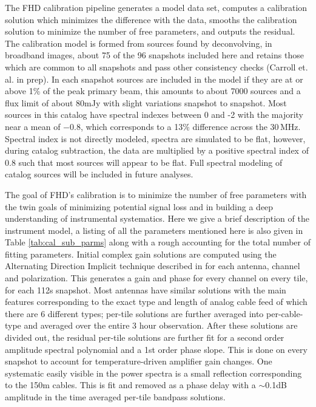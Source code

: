 \documentclass[twolcolumn,iop]{emulateapj}
\begin{document}
The FHD calibration pipeline generates a model data set, computes a calibration solution which minimizes the difference with the data, smooths the calibration solution to minimize the number of free parameters, and outputs the residual. The calibration model is formed from sources found by deconvolving, in broadband images, about 75 of the 96 snapshots included here and retains those which are common to all snapshots and pass other consistency checks (Carroll et. al. in prep). In each snapshot sources are included in the model if they are at or above 1\% of the peak primary beam, this amounts to about 7000 sources and a flux limit of about 80mJy with slight variations snapshot to snapshot. Most sources in this catalog have spectral indexes between 0 and -2 with the majority near a mean of $-0.8$, which corresponds to a 13\% difference across the 30\,MHz.  Spectral index is not directly modeled, spectra are simulated to be flat, however, during catalog subtraction, the data are multiplied by a positive spectral index of 0.8 such that most sources will appear to be flat. Full spectral modeling of catalog sources will be included in future analyses.


The goal of FHD's calibration is to minimize the number of free parameters with the twin goals of minimizing potential signal loss and in building a deep understanding of instrumental systematics. Here we give a brief description of the instrument model, a listing of all the parameters mentioned here is also given in Table \ref{tab:cal_sub_parms} along with a rough accounting for the total number of fitting parameters. Initial complex gain solutions are computed using the Alternating Direction Implicit technique described in \citet{sal14} for each antenna, channel and polarization.  This generates a gain and phase for every channel on every tile, for each 112s snapshot.  Most antennas have similar solutions with the main features corresponding to the exact type and length of analog cable feed of which there are 6 different types; per-tile solutions are further averaged into per-cable-type and averaged over the entire 3 hour observation. After these solutions are divided out, the residual per-tile solutions are further fit for a second order amplitude spectral polynomial and a 1st order phase slope. This is done on every snapshot to account for temperature-driven amplifier gain changes. 
One systematic easily visible in the power spectra is a small reflection corresponding to the 150m cables. This is fit and removed as a phase delay with a $\sim$0.1dB amplitude in the time averaged per-tile bandpass solutions.
\end{document}
